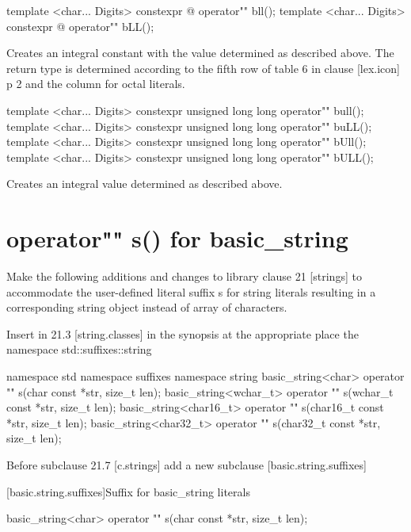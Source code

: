 \documentclass[ebook,11pt,article]{memoir}
\begin{document}
\begin{itemdecl}
template <char... Digits>
constexpr @\seebelow@ 
operator"" bll();
template <char... Digits>
constexpr @\seebelow@ 
operator"" bLL();
\end{itemdecl}

\begin{itemdescr}
\pnum
\effects
Creates an integral constant with the value determined as described above. The return type is determined according to the fifth row of table 6 in clause [lex.icon] p 2 and the column for octal literals. 
\end{itemdescr}
\begin{itemdecl}
template <char... Digits>
constexpr unsigned long long
operator"" bull();
template <char... Digits>
constexpr unsigned long long
operator"" buLL();
template <char... Digits>
constexpr unsigned long long
operator"" bUll();
template <char... Digits>
constexpr unsigned long long
operator"" bULL();
\end{itemdecl}

\begin{itemdescr}
\pnum
\effects
Creates an integral value determined as described above. 
\end{itemdescr}

\section{operator"" s() for basic_string}
Make the following additions and changes to library clause 21 [strings] to accommodate the user-defined literal suffix s for string literals resulting in a corresponding string object instead of array of characters.

Insert in 21.3 [string.classes] in the synopsis at the appropriate place the namespace std::suffixes::string
\begin{codeblock}
namespace std{
namespace suffixes{
namespace string{
basic_string<char> operator "" s(char const *str, size_t len);
basic_string<wchar_t> operator "" s(wchar_t const *str, size_t len);
basic_string<char16_t> operator "" s(char16_t const *str, size_t len);
basic_string<char32_t> operator "" s(char32_t const *str, size_t len);
}}}
\end{codeblock}

Before subclause 21.7 [c.strings] add a new subclause [basic.string.suffixes]

[basic.string.suffixes]{Suffix for basic_string literals}
\begin{itemdecl}
basic_string<char> operator "" s(char const *str, size_t len);
\end{itemdecl}
\end{document}
